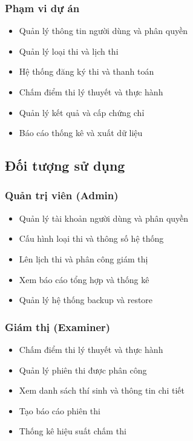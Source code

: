 \documentclass[12pt,a4paper]{article}
\begin{document}
\subsubsection{Phạm vi dự án}
\begin{itemize}
    \item Quản lý thông tin người dùng và phân quyền
    \item Quản lý loại thi và lịch thi
    \item Hệ thống đăng ký thi và thanh toán
    \item Chấm điểm thi lý thuyết và thực hành
    \item Quản lý kết quả và cấp chứng chỉ
    \item Báo cáo thống kê và xuất dữ liệu
\end{itemize}

\subsection{Đối tượng sử dụng}

\subsubsection{Quản trị viên (Admin)}
\begin{itemize}
    \item Quản lý tài khoản người dùng và phân quyền
    \item Cấu hình loại thi và thông số hệ thống
    \item Lên lịch thi và phân công giám thị
    \item Xem báo cáo tổng hợp và thống kê
    \item Quản lý hệ thống backup và restore
\end{itemize}

\subsubsection{Giám thị (Examiner)}
\begin{itemize}
    \item Chấm điểm thi lý thuyết và thực hành
    \item Quản lý phiên thi được phân công
    \item Xem danh sách thí sinh và thông tin chi tiết
    \item Tạo báo cáo phiên thi
    \item Thống kê hiệu suất chấm thi
\end{itemize}
\end{document}
